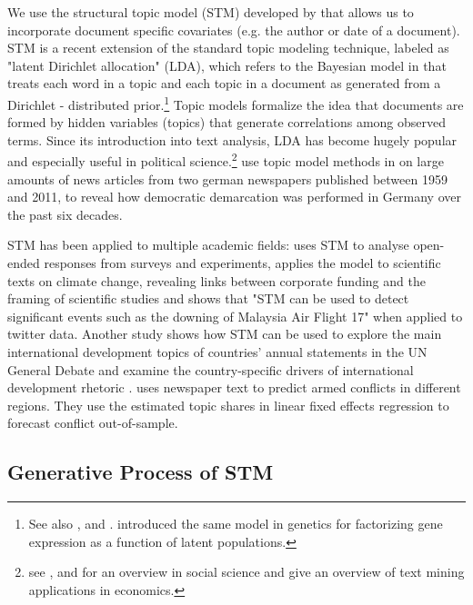 \documentclass[12pt,a4paper,notitlepage]{article}
\begin{document}
We use the structural topic model (STM) developed by \citet{roberts_model_2016} that allows us to incorporate document specific covariates (e.g. the author or date of a document). STM is a recent extension of the standard topic modeling technique, labeled as "latent Dirichlet allocation" (LDA), which refers to the Bayesian model in \citet{blei_latent_2003} that treats each word in a topic and each topic in a document as generated from a Dirichlet - distributed prior.\footnote{See also \citet{griffiths_probabilistic_2002}, \citet{griffiths_finding_2004} and \citet{hofmann_probabilistic_1999}. \citet{pritchard_inference_2000} introduced the same model in genetics for factorizing gene expression as a function of latent populations.} Topic models formalize the idea that documents are formed by hidden variables (topics) that generate correlations among observed terms. Since its introduction into text analysis, LDA has become hugely popular and especially useful in political science.\footnote{see \citet{blei_probabilistic_2012}, \citet{grimmer_text_2013} and \citet{wiedmann_text_2016} for an overview in social science and \citet{gentzkow_text_2017} give an overview of text mining applications in economics.} \citet{wiedmann_text_2016} use topic model methods in on large amounts of news articles from two german newspapers published between 1959 and 2011, to reveal how democratic demarcation was performed in Germany over the past six decades. 

STM has been applied to multiple academic fields: \citet{roberts_structural_2014} uses STM to analyse open-ended responses from surveys and experiments, \citet{farrell_corporate_2016} applies the model to scientific texts on climate change, revealing links between corporate funding and the framing of scientific studies and \citet{mishler_using_2015} shows that "STM can be used to detect significant events such as the downing of Malaysia Air Flight 17" when applied to twitter data. Another study shows how STM can be used to explore the main international development topics of countries’ annual statements in the UN General Debate and examine the country-specific drivers of international development rhetoric \citep{baturo_what_2017}. \citet{mueller_reading_2016} uses newspaper text to predict armed conflicts in different regions. They use the estimated topic shares in linear fixed effects regression to forecast conflict out-of-sample.

\subsection{Generative Process of STM}
\end{document}

